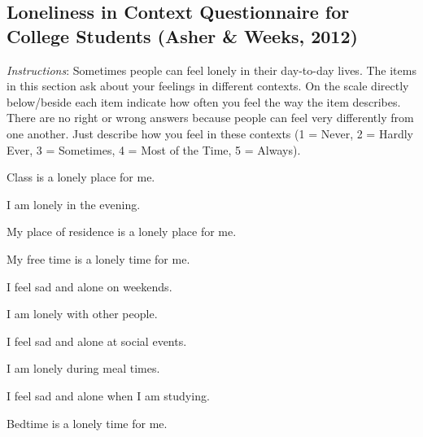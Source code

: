 \documentclass[
  english,
  man]{apa6}
\begin{document}
\subsection{Loneliness in Context Questionnaire for College Students (Asher \& Weeks, 2012)}\label{loneliness-in-context-questionnaire-for-college-students-asher-weeks-2012}

\emph{Instructions}: Sometimes people can feel lonely in their day-to-day lives. The items in this section ask about your feelings in different contexts. On the scale directly below/beside each item indicate how often you feel the way the item describes. There are no right or wrong answers because people can feel very differently from one another. Just describe how you feel in these contexts (1 = Never, 2 = Hardly Ever, 3 = Sometimes, 4 = Most of the Time, 5 = Always).

Class is a lonely place for me.

I am lonely in the evening.

My place of residence is a lonely place for me.

My free time is a lonely time for me.

I feel sad and alone on weekends.

I am lonely with other people.

I feel sad and alone at social events.

I am lonely during meal times.

I feel sad and alone when I am studying.

Bedtime is a lonely time for me.
\end{document}
